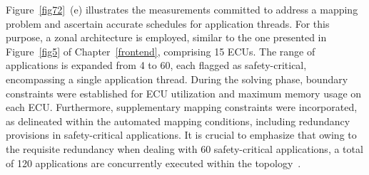      
    Figure~\ref{fig72}~(e) illustrates the measurements committed to address a mapping problem and ascertain accurate schedules for application threads. For this purpose, a zonal architecture is employed, similar to the one presented in Figure~\ref{fig5} of Chapter~\ref{frontend}, comprising 15 ECUs. The range of applications is expanded from 4 to 60, each flagged as safety-critical, encompassing a single application thread.
    During the solving phase, boundary constraints were established for ECU utilization and maximum memory usage on each ECU. Furthermore, supplementary mapping constraints were incorporated, as delineated within the automated mapping conditions, including redundancy provisions in safety-critical applications. It is crucial to emphasize that owing to the requisite redundancy when dealing with 60 safety-critical applications, a total of 120 applications are concurrently executed within the topology~\cite{askaripoor2023designer}.
     
